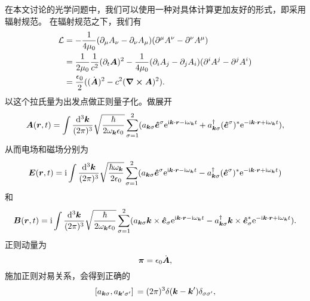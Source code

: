 \documentclass[UTF8, a4paper]{ctexart}
\newcommand*{\ee}{\mathrm{e}}
\newcommand*{\ii}{\mathrm{i}}
\begin{document}
在本文讨论的光学问题中，我们可以使用一种对具体计算更加友好的形式，即采用辐射规范。
在辐射规范之下，我们有
\begin{equation}
    \begin{aligned}
        \mathcal{L} &= - \frac{1}{4 \mu_0} (\partial_\mu A_\nu - \partial_\nu A_\mu) (\partial^\mu A^\nu - \partial^\nu A^\mu) \\
        &= \frac{1}{2 \mu_0} \frac{1}{c^2} (\partial_t \vb*{A})^2 - \frac{1}{4\mu_0} (\partial_i A_j - \partial_j A_i) (\partial^i A^j - \partial^j A^i) \\
        &= \frac{\epsilon_0}{2} ((\dot{\vb*{A}})^2 - c^2 (\curl{\vb*{A}})^2).
    \end{aligned}
\end{equation}
以这个拉氏量为出发点做正则量子化。做展开
\begin{equation}
    \vb*{A}(\vb*{r}, t) = \int \frac{\dd[3]{\vb*{k}}}{(2\pi)^3} \sqrt{\frac{\hbar}{2 \omega_{\vb*{k}} \epsilon_0}} \sum_{\sigma=1}^2 (a_{\vb*{k} \sigma} \vu*{e}^\sigma \ee^{\ii \vb*{k} \cdot \vb*{r} - \ii \omega_{\vb*{k}} t} + a^\dagger_{\vb*{k} \sigma} (\vu*{e}^\sigma)^* \ee^{- \ii \vb*{k} \cdot \vb*{r} + \ii \omega_{\vb*{k}} t}),
\end{equation}
从而电场和磁场分别为
\begin{equation}
    \vb*{E}(\vb*{r}, t) = \ii \int \frac{\dd[3]{\vb*{k}}}{(2\pi)^3} \sqrt{\frac{\hbar \omega_{\vb*{k}}}{2 \epsilon_0}} \sum_{\sigma=1}^2 (a_{\vb*{k} \sigma} \vu*{e}^\sigma \ee^{\ii \vb*{k} \cdot \vb*{r} - \ii \omega_{\vb*{k}} t} - a^\dagger_{\vb*{k} \sigma} (\vu*{e}^\sigma)^* \ee^{- \ii \vb*{k} \cdot \vb*{r} + \ii \omega_{\vb*{k}} t})
\end{equation}
和
\begin{equation}
    \vb*{B}(\vb*{r}, t) = \ii \int \frac{\dd[3]{\vb*{k}}}{(2\pi)^3} \sqrt{\frac{\hbar}{2 \omega_{\vb*{k}} \epsilon_0}} \sum_{\sigma=1}^2 (a_{\vb*{k} \sigma} \vb*{k} \times \vu*{e}_\sigma \ee^{\ii \vb*{k} \cdot \vb*{r} - \ii \omega_{\vb*{k}} t} - a^\dagger_{\vb*{k} \sigma} \vb*{k} \times \vu*{e}_\sigma^* \ee^{- \ii \vb*{k} \cdot \vb*{r} + \ii \omega_{\vb*{k}} t}).
\end{equation}
正则动量为
\begin{equation}
    \vb*{\pi} = \epsilon_0 \dot{\vb*{A}},
\end{equation}
施加正则对易关系，会得到正确的
\begin{equation}
    \comm*{a_{\vb*{k} \sigma}}{a_{\vb*{k}' \sigma'}} = (2\pi)^3 \delta(\vb*{k} - \vb*{k}') \delta_{\sigma \sigma'},
\end{equation}
\end{document}

